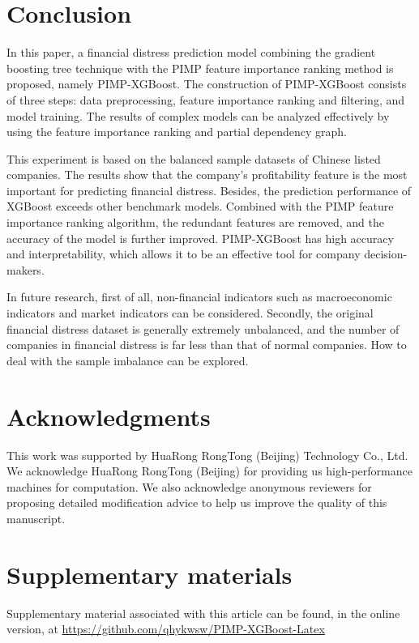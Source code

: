 \documentclass[review]{elsarticle}
\begin{document}
\section{Conclusion}
\label{section_6}
In this paper, a financial distress prediction model combining the gradient boosting tree technique with the PIMP feature importance ranking method is proposed, namely PIMP-XGBoost. The construction of PIMP-XGBoost consists of three steps: data preprocessing, feature importance ranking and filtering, and model training. The results of complex models can be analyzed effectively by using the feature importance ranking and partial dependency graph.

This experiment is based on the balanced sample datasets of Chinese listed companies. The results show that the company’s profitability feature is the most important for predicting financial distress. Besides, the prediction performance of XGBoost exceeds other benchmark models. Combined with the PIMP feature importance ranking algorithm, the redundant features are removed, and the accuracy of the model is further improved. PIMP-XGBoost has high accuracy and interpretability, which allows it to be an effective tool for company decision-makers.

In future research, first of all, non-financial indicators such as macroeconomic indicators and market indicators can be considered. Secondly, the original financial distress dataset is generally extremely unbalanced, and the number of companies in financial distress is far less than that of normal companies. How to deal with the sample imbalance can be explored.

\section*{Acknowledgments}
This work was supported by HuaRong RongTong (Beijing) Technology Co., Ltd. We acknowledge HuaRong RongTong (Beijing) for providing us high-performance machines for computation. We also acknowledge anonymous reviewers for proposing detailed modification advice to help us improve the quality of this manuscript.

\section*{Supplementary materials}
\label{supplementary_materials}
Supplementary material associated with this article can be
found, in the online version, at \url{https://github.com/qhykwsw/PIMP-XGBoost-Latex}


\end{document}
